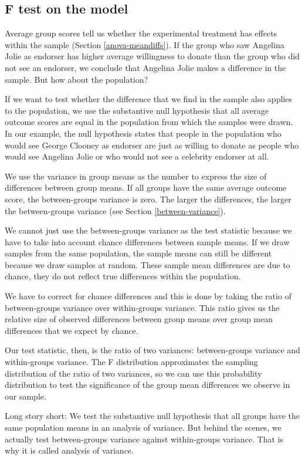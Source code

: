 \documentclass[a4paper]{book}
\theoremstyle{definition}
\theoremstyle{definition}
\theoremstyle{definition}
\theoremstyle{remark}
\begin{document}
\subsection{F test on the model}\label{anova-model}

Average group scores tell us whether the experimental treatment has
effects within the sample (Section \ref{anova-meandiffs}). If the group
who saw Angelina Jolie as endorser has higher average willingness to
donate than the group who did not see an endorser, we conclude that
Angelina Jolie makes a difference in the sample. But how about the
population?

If we want to test whether the difference that we find in the sample
also applies to the population, we use the substantive null hypothesis
that all average outcome scores are equal in the population from which
the samples were drawn. In our example, the null hypothesis states that
people in the population who would see George Clooney as endorser are
just as willing to donate as people who would see Angelina Jolie or who
would not see a celebrity endorser at all.

We use the variance in group means as the number to express the size of
differences between group means. If all groups have the same average
outcome score, the between-groups variance is zero. The larger the
differences, the larger the between-groups variance (see Section
\ref{between-variance}).

We cannot just use the between-groups variance as the test statistic
because we have to take into account chance differences between sample
means. If we draw samples from the same population, the sample means can
still be different because we draw samples at random. These sample mean
differences are due to chance, they do not reflect true differences
within the population.

We have to correct for chance differences and this is done by taking the
ratio of between-groups variance over within-groups variance. This ratio
gives us the relative size of observed differences between group means
over group mean differences that we expect by chance.

Our test statistic, then, is the ratio of two variances: between-groups
variance and within-groups variance. The F distribution approximates the
sampling distribution of the ratio of two variances, so we can use this
probability distribution to test the significance of the group mean
differences we observe in our sample.

Long story short: We test the substantive null hypothesis that all
groups have the same population means in an analysis of variance. But
behind the scenes, we actually test between-groups variance against
within-groups variance. That is why it is called analysis of variance.
\end{document}
